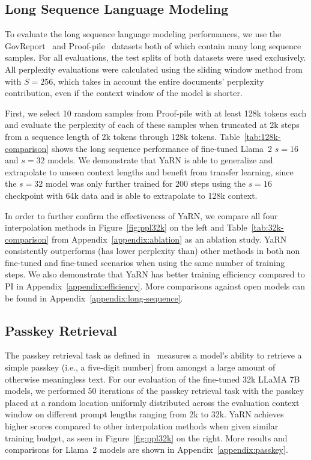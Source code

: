 \subsection{Long Sequence Language Modeling}\label{sec:long-sequence}

To evaluate the long sequence language modeling performances, we use the GovReport~\citep{huang-etal-2021-efficient} and Proof-pile~\citep{proofpile} datasets both of which contain many long sequence samples. For all evaluations, the test splits of both datasets were used exclusively. All perplexity evaluations were calculated using the sliding window method from~\citet{press2022train} with $S = 256$, which takes in account the entire documents' perplexity contribution, even if the context window of the model is shorter.

First, we select 10 random samples from Proof-pile with at least 128k tokens each and evaluate the perplexity of each of these samples when truncated at 2k steps from a sequence length of 2k tokens through 128k tokens. Table~\ref{tab:128k-comparison} shows the long sequence performance of fine-tuned Llama~2 $s=16$ and $s=32$ models. We demonstrate that YaRN is able to generalize and extrapolate to unseen context lengths and benefit from transfer learning, since the $s=32$ model was only further trained for 200 steps using the $s=16$ checkpoint with 64k data and is able to extrapolate to 128k context.

In order to further confirm the effectiveness of YaRN, we compare all four interpolation methods in Figure~\ref{fig:ppl32k} on the left and Table~\ref{tab:32k-comparison} from Appendix~\ref{appendix:ablation} as an ablation study. YaRN consistently outperforms (has lower perplexity than) other methods in both non fine-tuned and fine-tuned scenarios when using the same number of training steps. We also demonstrate that YaRN has better training efficiency compared to PI in Appendix~\ref{appendix:efficiency}. More comparisons against open models can be found in Appendix~\ref{appendix:long-sequence}.

\subsection{Passkey Retrieval}

The passkey retrieval task as defined in~\cite{mohtashami2023landmark} measures a model's ability to retrieve a simple passkey (i.e., a five-digit number) from amongst a large amount of otherwise meaningless text. For our evaluation of the fine-tuned 32k LLaMA 7B models, we performed 50 iterations of the passkey retrieval task with the passkey placed at a random location uniformly distributed across the evaluation context window on different prompt lengths ranging from 2k to 32k. YaRN achieves higher scores compared to other interpolation methods when given similar training budget, as seen in Figure~\ref{fig:ppl32k} on the right. More results and comparisons for Llama~2 models are shown in Appendix~\ref{appendix:passkey}.

